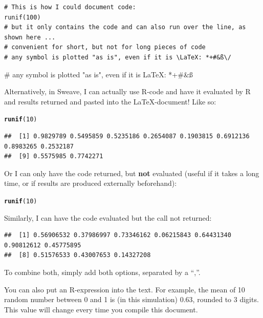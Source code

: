 \documentclass[11pt, a4paper]{article}\usepackage[]{graphicx}\usepackage[]{color}
\makeatletter
\newcommand{\hlnum}[1]{\textcolor[rgb]{0.686,0.059,0.569}{#1}}%
\newcommand{\hlstd}[1]{\textcolor[rgb]{0.345,0.345,0.345}{#1}}%
\newcommand{\hlkwd}[1]{\textcolor[rgb]{0.737,0.353,0.396}{\textbf{#1}}}%
\newenvironment{kframe}{%
 \def\at@end@of@kframe{}%
 \ifinner\ifhmode%
  \def\at@end@of@kframe{\end{minipage}}%
  \begin{minipage}{\columnwidth}%
 \fi\fi%
 \def\FrameCommand##1{\hskip\@totalleftmargin \hskip-\fboxsep
 \colorbox{shadecolor}{##1}\hskip-\fboxsep
     \hskip-\linewidth \hskip-\@totalleftmargin \hskip\columnwidth}%
 \MakeFramed {\advance\hsize-\width
   \@totalleftmargin\z@ \linewidth\hsize
   \@setminipage}}%
 {\par\unskip\endMakeFramed%
 \at@end@of@kframe}
\newenvironment{knitrout}{}{} %
\makeatother
\begin{document}
\begin{verbatim}
# This is how I could document code:
runif(100)
# but it only contains the code and can also run over the line, as shown here ...
# convenient for short, but not for long pieces of code
# any symbol is plotted "as is", even if it is \LaTeX: *+#&ß\/
\end{verbatim}

# any symbol is plotted "as is", even if it is \LaTeX: *+#&ß\/


Alternatively, in Sweave, I can actually use R-code and have it evaluated by R and results returned and pasted into the \LaTeX-document! Like so:
\begin{knitrout}
\color{fgcolor}\begin{kframe}
\begin{alltt}
\hlkwd{runif}\hlstd{(}\hlnum{10}\hlstd{)}
\end{alltt}
\begin{verbatim}
##  [1] 0.9829789 0.5495859 0.5235186 0.2654087 0.1903815 0.6912136 0.8983265 0.2532187
##  [9] 0.5575985 0.7742271
\end{verbatim}
\end{kframe}
\end{knitrout}
Or I can only have the code returned, but \textbf{not} evaluated (useful if it takes a long time, or if results are produced externally beforehand):
\begin{knitrout}
\color{fgcolor}\begin{kframe}
\begin{alltt}
\hlkwd{runif}\hlstd{(}\hlnum{10}\hlstd{)}
\end{alltt}
\end{kframe}
\end{knitrout}
Similarly, I can have the code evaluated but the call not returned:
\begin{knitrout}
\color{fgcolor}\begin{kframe}
\begin{verbatim}
##  [1] 0.56906532 0.37986997 0.73346162 0.06215843 0.64431340 0.90812612 0.45775895
##  [8] 0.51576533 0.43007653 0.14327208
\end{verbatim}
\end{kframe}
\end{knitrout}
To combine both, simply add both options, separated by a ``,''.

You can also put an R-expression into the text. For example, the mean of 10 random number between 0 and 1 is (in this simulation) 0.63, rounded to 3 digits. This value will change every time you compile this document.
\end{document}
